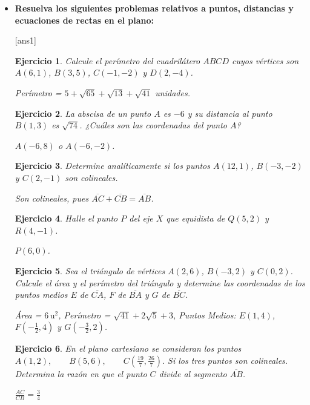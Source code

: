 \documentclass[12pt,a4paper]{article}
\newtheorem{ex}{Ejercicio}
\begin{document}
\begin{itemize} 
\item[{\textbf A)}] \textbf{Resuelva los siguientes problemas relativos a puntos, distancias y ecuaciones de rectas en el plano:}

[ans1] 

\begin{ex}
Calcule el perímetro del cuadrilátero $ABCD$ cuyos vértices son $A(6,1)$, $B(3,5)$, $C(-1,-2)$ y $D(2,-4)$. 
\begin{sol} Perímetro = $5+\sqrt{65}+\sqrt{13}+\sqrt{41}$ unidades. \end{sol}
\end{ex}

\begin{ex}
La abscisa de un punto $A$ es $-6$ y su distancia al punto $B(1,3)$ es $\sqrt{74}$. ¿Cuáles son las coordenadas del punto $A$? 
\begin{sol} $A(-6,8)$ o $A(-6,-2)$. \end{sol}
\end{ex}

\begin{ex}
Determine analíticamente si los puntos $A(12,1)$, $B(-3,-2)$ y $C(2,-1)$ son colineales. 
\begin{sol} Son colineales, pues $\overline{AC} + \overline{CB} = \overline{AB}$. \end{sol}
\end{ex}

\begin{ex}
Halle el punto $P$ del eje $X$ que equidista de $Q(5,2)$ y $R(4,-1)$. 
\begin{sol} $P(6,0)$. \end{sol}
\end{ex}

\begin{ex}
Sea el triángulo de vértices $A(2,6)$, $B(-3,2)$ y $C(0,2)$. Calcule el área y el perímetro del triángulo y determine las coordenadas de los puntos medios $E$ de $\overline{CA}$, $F$ de $\overline{BA}$ y $G$ de $\overline{BC}$.
\begin{sol} Área = $6\,\text{u}^2$, Perímetro = $\sqrt{41}+2\sqrt{5}+3$, Puntos Medios: $E(1,4)$, $F\left(-\frac{1}{2},4\right)$ y $G\left(-\frac{3}{2}, 2\right)$. \end{sol}
\end{ex}


\begin{ex}
En el plano cartesiano se consideran los puntos
$A(1,2),\qquad B(5,6),\qquad C\left(\frac{19}{7},\frac{26}{7}\right).
$
Si los tres puntos son colineales.
Determina la razón en que el punto $C$ divide al segmento $\overline{AB}$.
\begin{sol} $\frac{AC}{CB}=\frac{3}{4}$
\end{sol}
\end{ex}


\end{itemize}
\end{document}
